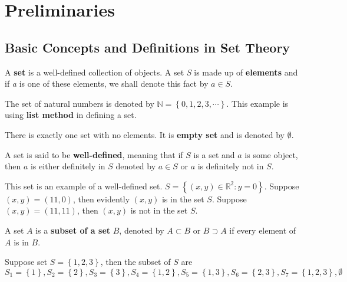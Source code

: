 \chapter{Preliminaries}
\label{chap:pre}

\section{Basic Concepts and Definitions in Set Theory}
\begin{defn}[Set]\rm 
\cite{fraleigh}A \textbf{set} is a well-defined collection of objects. A set \textit{S} is made up of \textbf{elements} and if \textit{a} is one of these elements, we shall denote this fact by $a\in S$.  
\end{defn}

\begin{e.g.}\rm
The set of natural numbers is denoted by $\mathbb{N}=\left\lbrace 0,1,2,3,\cdots\right\rbrace$. This example is using \textbf{list method} in defining a set.
\end{e.g.}

\begin{defn}\rm
\cite{fraleigh}There is exactly one set with no elements. It is \textbf{empty set} and is denoted by $\emptyset$.
\end{defn}

\begin{defn}\rm
\cite{fraleigh}A set is said to be \textbf{well-defined}, meaning that if $S$ is a set and $a$ is some object, then $a$ is either definitely in $S$ denoted by $a\in S$ or $a$ is definitely not in $S$.
\end{defn}

\begin{e.g.}\rm
This set is an example of a well-defined set. $S=\left\lbrace (x,y)\in \mathbb{R}^2: y=0\right\rbrace$. Suppose $(x,y)=(11,0)$, then evidently $(x,y)$ is in the set $S$. Suppose $(x,y)=(11,11)$, then $(x,y)$ is not in the set $S$. 
\end{e.g.}

\begin{defn}\rm
\cite{fraleigh}A set $A$ is a \textbf{subset of a set} $B$, denoted by $A\subset B$ or $B \supset A$ if every element of $A$ is in $B$. 
\end{defn}

\begin{e.g.}\rm
Suppose set $S=\left\lbrace 1,2,3 \right\rbrace$, then the subset of $S$ are $S_1=\left\lbrace 1 \right\rbrace, S_2=\left\lbrace 2 \right\rbrace, S_3=\left\lbrace 3 \right\rbrace, S_4=\left\lbrace 1,2\right\rbrace,S_5=\left\lbrace 1,3\right\rbrace, S_6=\left\lbrace 2,3\right\rbrace,S_7=\left\lbrace 1,2,3\right\rbrace, \emptyset$
\end{e.g.}

